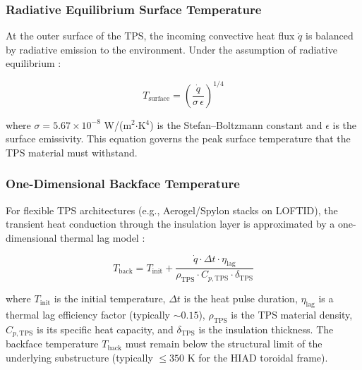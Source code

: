 \subsubsection*{Radiative Equilibrium Surface Temperature}
At the outer surface of the TPS, the incoming convective heat flux $\dot{q}$ is balanced by radiative emission to the environment. Under the assumption of radiative equilibrium \cite{AndersonHypersonic}:

\begin{equation}
    T_{\text{surface}} = \left( \frac{\dot{q}}{\sigma \, \epsilon} \right)^{1/4}
    \label{eq:radiative_equilibrium}
\end{equation}

\noindent where $\sigma = 5.67 \times 10^{-8}$ W/(m$^{2}$$\cdot$K$^{4}$) is the Stefan--Boltzmann constant and $\epsilon$ is the surface emissivity. This equation governs the peak surface temperature that the TPS material must withstand.

\subsubsection*{One-Dimensional Backface Temperature}
For flexible TPS architectures (e.g., Aerogel/Spylon stacks on LOFTID), the transient heat conduction through the insulation layer is approximated by a one-dimensional thermal lag model \cite{hollis2017backface}:

\begin{equation}
    T_{\text{back}} = T_{\text{init}} + \frac{\dot{q} \cdot \Delta t \cdot \eta_{\text{lag}}}{\rho_{\text{TPS}} \cdot C_{p,\text{TPS}} \cdot \delta_{\text{TPS}}}
    \label{eq:backface_temperature}
\end{equation}

\noindent where $T_{\text{init}}$ is the initial temperature, $\Delta t$ is the heat pulse duration, $\eta_{\text{lag}}$ is a thermal lag efficiency factor (typically $\sim 0.15$), $\rho_{\text{TPS}}$ is the TPS material density, $C_{p,\text{TPS}}$ is its specific heat capacity, and $\delta_{\text{TPS}}$ is the insulation thickness. The backface temperature $T_{\text{back}}$ must remain below the structural limit of the underlying substructure (typically $\leq 350$ K for the HIAD toroidal frame).

